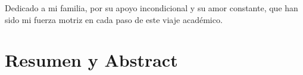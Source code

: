 \documentclass[11pt,twoside]{book}
\author{Naoufal Saidi Hassani}
\begin{document}
\frontmatter

\portada

\begin{dedicatoria}
Dedicado a mi familia, por su apoyo incondicional y su amor constante, que han sido mi fuerza motriz en cada paso de este viaje académico.
\end{dedicatoria}



\chapter*{Resumen y Abstract}


\mainmatter
\marcagua









\appendix


\backmatter

\end{document}
